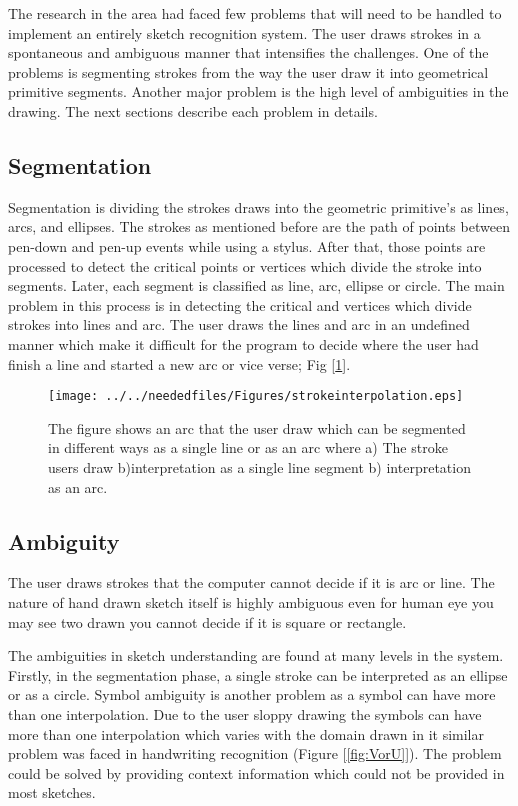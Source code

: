 The research in the area had faced few problems that will need to be handled to implement an entirely sketch recognition system. The user draws strokes in a spontaneous and ambiguous manner that intensifies the challenges. One of the problems is segmenting strokes from the way the user draw it into geometrical primitive segments. Another major problem is the high level of ambiguities in the drawing. The next sections describe each problem in details. 
\subsection {Segmentation}
Segmentation is dividing the strokes draws into the geometric primitive's as lines, arcs, and ellipses. The strokes as mentioned before are the path of points between pen-down and pen-up events while using a stylus. After that, those points are processed to detect the critical points or vertices which divide the stroke into segments. Later, each segment is classified as line, arc, ellipse or circle. The main problem in this process is in detecting the critical and vertices which divide strokes into lines and arc. The user draws the lines and arc in an undefined manner which make it difficult for the program to decide where the user had finish a line and started a new arc or vice verse; Fig [\ref {fig:strokeinterpolation}].
\begin{figure}

\begin{center}
		\texttt{[image: ../../neededfiles/Figures/strokeinterpolation.eps]}
	\caption[Segmentation error]{The figure shows an arc that the user draw which can be segmented in different ways as a single line or as an arc where a) The stroke users draw  b)interpretation as a single line segment b) interpretation as an arc.}
	\label{fig:strokeinterpolation}
\end{center}
\end{figure}

\subsection{Ambiguity}
The user draws strokes that the computer cannot decide if it is arc or line. The nature of hand drawn sketch itself is highly ambiguous even for human eye you may see two drawn you cannot decide if it is square or rectangle.

 The ambiguities in sketch understanding are found at many levels in the system. Firstly, in the segmentation phase, a single stroke can be interpreted as an ellipse or as a circle. Symbol ambiguity is another problem as a symbol can have more than one interpolation. Due to the user sloppy drawing the symbols can have more than one interpolation which varies with the domain drawn in it similar problem was faced in handwriting recognition (Figure [\ref{fig:VorU}]). The problem could be solved by providing context information which could not be provided in most sketches. 
 

